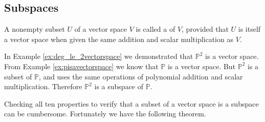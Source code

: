 \documentclass{ximera}
\begin{document}
\subsection*{Subspaces}
\begin{definition}
A nonempty subset $U$ of a vector space $V$ is called a  of $V$, provided that $U$ is itself a vector space when given the same addition and scalar multiplication as $V$.
\end{definition}

\begin{example}
In Example \ref{ex:deg_le_2vectorspace} we demonstrated that $\mathbb{P}^2$ is a vector space.  From Example \ref{ex:pisavectorspace} we know that $\mathbb{P}$ is a vector space. But $\mathbb{P}^2$ is a subset of $\mathbb{P}$, and uses the same operations of polynomial addition and scalar multiplication.  Therefore $\mathbb{P}^2$ is a subspace of $\mathbb{P}$.
\end{example}

Checking all ten properties to verify that a subset of a vector space is a subspace can be cumbersome.  Fortunately we have the following theorem.
\end{document}
